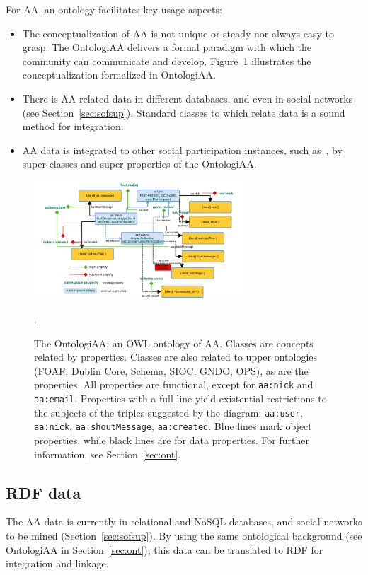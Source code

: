 \documentclass[12pt,fleqn]{article}
\begin{document}
For AA, an ontology facilitates key usage aspects:
\begin{itemize}
    \item The conceptualization of AA is not unique or steady nor always easy to grasp.
	    The OntologiAA delivers a formal paradigm with which the community can communicate and develop.
		Figure~\ref{fig:ontologiaa} illustrates the conceptualization formalized in OntologiAA.
    \item There is AA related data in different databases,
	    and even in social networks (see Section~\ref{sec:sofsup}).
		Standard classes to which relate data is a sound method for integration.
    \item AA data is integrated to other social participation instances,
	    such as~\cite{participa,cd}, by super-classes and super-properties of the OntologiAA.
\end{itemize}

\begin{figure}[!htbp] %
\vspace{-2pt}
\begin{center}
    \includegraphics[width=0.7\textwidth]{../imgs/ontologiaa_}
    \caption{The OntologiAA: an OWL ontology of AA. Classes are concepts related by properties.
	Classes are also related to upper ontologies (FOAF, Dublin Core, Schema, SIOC, GNDO, OPS), as are the properties.
	All properties are functional, except for {\tt aa:nick} and {\tt aa:email}.
	Properties with a full line yield existential restrictions to the subjects of the triples suggested by the diagram: 
	{\tt aa:user}, {\tt aa:nick}, {\tt aa:shoutMessage}, {\tt aa:created}.
	Blue lines mark object properties, while black lines are for data properties.
	For further information, see Section~\ref{sec:ont}.}.
    \label{fig:ontologiaa}
\end{center}
\end{figure}


\subsection{RDF data}
The AA data is currently in relational and NoSQL databases,
and social networks to be mined (Section~\ref{sec:sofsup}).
By using the same ontological background (see OntologiAA in Section~\ref{sec:ont}),
this data can be translated to RDF for integration and linkage.
\end{document}
